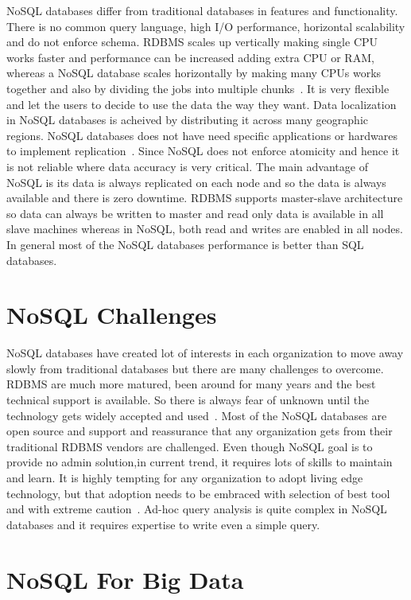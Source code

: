 NoSQL databases differ from traditional databases in features 
and functionality. There is no common query language, high 
I/O performance, horizontal scalability and do not enforce 
schema. RDBMS scales up vertically making single CPU works 
faster and performance can be increased adding extra CPU or 
RAM, whereas a NoSQL database scales horizontally by making 
many CPUs works together and also by dividing the jobs into 
multiple chunks~\cite{hid-sp18-710-datastax}. It is very flexible
and let the users to decide to use the data the way they want. 
Data localization in NoSQL databases is acheived by distributing
it across many geographic regions. NoSQL databases does not have
need specific applications or hardwares to implement 
replication~\cite{hid-sp18-710-mongo}. Since NoSQL does not enforce
atomicity and hence it is not reliable where data accuracy is very 
critical. The main advantage of NoSQL is its data is always replicated
on each node and so the data is always available and there is zero 
downtime. RDBMS supports master-slave architecture so data can always
be written to master and read only data is available in all slave 
machines whereas in NoSQL, both read and writes are enabled in all
nodes. In general most of the NoSQL databases performance is better
than SQL databases.

\section{NoSQL Challenges}

NoSQL databases have created lot of interests in each organization to move
away slowly from traditional databases but there are many challenges
to overcome. RDBMS are much more matured, been around for many years 
and the best technical support is available. So there is always fear
of unknown until the technology gets widely accepted and 
used~\cite{hid-sp18-710-neal}. Most of the NoSQL databases are open
source and support and reassurance that any organization gets from their
traditional RDBMS vendors are challenged. Even though NoSQL goal is to
provide no admin solution,in current trend, it requires lots of skills 
to maintain and learn. It is highly tempting for any organization
to adopt living edge technology, but that adoption needs to be 
embraced with selection of best tool and with extreme
caution~\cite{hid-sp18-710-dbkumar}. Ad-hoc query analysis is quite
complex in NoSQL databases and it requires expertise to write even a
simple query.

\section{NoSQL For Big Data}

